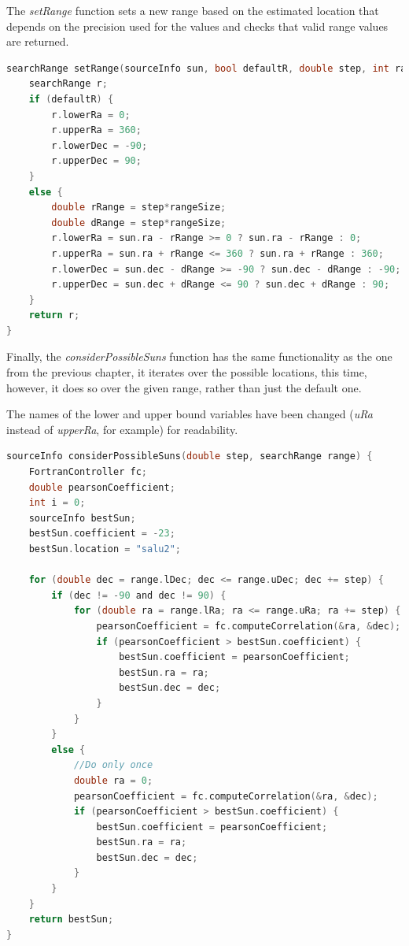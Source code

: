 The \textit{setRange} function sets a new range based on the estimated location that depends on the precision used for the values and checks that valid range values are returned.

\begin{minipage}{\linewidth}
	\begin{lstlisting}[language=c, caption=Setting the new range based on the estimated source location]
searchRange setRange(sourceInfo sun, bool defaultR, double step, int rangeSize) {
	searchRange r;
	if (defaultR) {
		r.lowerRa = 0;
		r.upperRa = 360;
		r.lowerDec = -90;
		r.upperDec = 90;
	}
	else {
		double rRange = step*rangeSize;
		double dRange = step*rangeSize;
		r.lowerRa = sun.ra - rRange >= 0 ? sun.ra - rRange : 0;
		r.upperRa = sun.ra + rRange <= 360 ? sun.ra + rRange : 360;
		r.lowerDec = sun.dec - dRange >= -90 ? sun.dec - dRange : -90;
		r.upperDec = sun.dec + dRange <= 90 ? sun.dec + dRange : 90;
	}
	return r;
}\end{lstlisting}
\end{minipage}

Finally, the \textit{considerPossibleSuns} function has the same functionality as the one from the previous chapter, it iterates over the possible locations, this time, however, it does so over the given range, rather than just the default one.

The names of the lower and upper bound variables have been changed (\textit{uRa} instead of \textit{upperRa}, for example) for readability.

\begin{minipage}{\linewidth}
	\begin{lstlisting}[language=c, caption=Iterating over possible locations within the given range]
sourceInfo considerPossibleSuns(double step, searchRange range) {
	FortranController fc;
	double pearsonCoefficient;
	int i = 0;
	sourceInfo bestSun;
	bestSun.coefficient = -23;
	bestSun.location = "salu2";

	for (double dec = range.lDec; dec <= range.uDec; dec += step) {
		if (dec != -90 and dec != 90) {
			for (double ra = range.lRa; ra <= range.uRa; ra += step) {
				pearsonCoefficient = fc.computeCorrelation(&ra, &dec);
				if (pearsonCoefficient > bestSun.coefficient) {
					bestSun.coefficient = pearsonCoefficient;
					bestSun.ra = ra;
					bestSun.dec = dec;
				}
			}
		}
		else {
			//Do only once
			double ra = 0;
			pearsonCoefficient = fc.computeCorrelation(&ra, &dec);
			if (pearsonCoefficient > bestSun.coefficient) {
				bestSun.coefficient = pearsonCoefficient;
				bestSun.ra = ra;
				bestSun.dec = dec;
			}
		}
	}
	return bestSun;
}\end{lstlisting}
\end{minipage}

